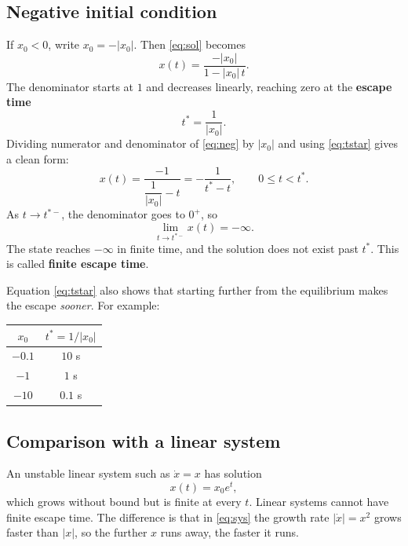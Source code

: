 \documentclass[11pt]{article}
\begin{document}
\subsection*{Negative initial condition}
If $x_0 < 0$, write $x_0 = -|x_0|$. Then \eqref{eq:sol} becomes
\begin{equation}
  x(t) = \frac{-|x_0|}{1 - |x_0|\, t} .
  \label{eq:neg}
\end{equation}
The denominator starts at $1$ and decreases linearly, reaching zero at the \textbf{escape time}
\begin{equation}
  t^* = \frac{1}{|x_0|} .
  \label{eq:tstar}
\end{equation}
Dividing numerator and denominator of \eqref{eq:neg} by $|x_0|$ and using \eqref{eq:tstar} gives a clean form:
\begin{equation}
  x(t) = \frac{-1}{\dfrac{1}{|x_0|} - t} = -\frac{1}{t^* - t},
  \qquad 0 \le t < t^* .
  \label{eq:blowup}
\end{equation}
As $t \to t^{*-}$, the denominator goes to $0^+$, so
\begin{equation}
  \lim_{t \to t^{*-}} x(t) = -\infty .
  \label{eq:limit}
\end{equation}
The state reaches $-\infty$ in finite time, and the solution does not exist past $t^*$. This is called \textbf{finite escape time}.

Equation \eqref{eq:tstar} also shows that starting further from the equilibrium makes the escape \emph{sooner}. For example:
\begin{center}
\begin{tabular}{c|c}
  $x_0$ & $t^* = 1/|x_0|$ \\ \hline
  $-0.1$ & $10$ s \\
  $-1$ & $1$ s \\
  $-10$ & $0.1$ s
\end{tabular}
\end{center}

\subsection*{Comparison with a linear system}
An unstable linear system such as $\dot{x} = x$ has solution
\begin{equation}
  x(t) = x_0 e^{t},
  \label{eq:lin}
\end{equation}
which grows without bound but is finite at every $t$. Linear systems cannot have finite escape time. The difference is that in \eqref{eq:sys} the growth rate $|\dot{x}| = x^2$ grows faster than $|x|$, so the further $x$ runs away, the faster it runs.
\end{document}
